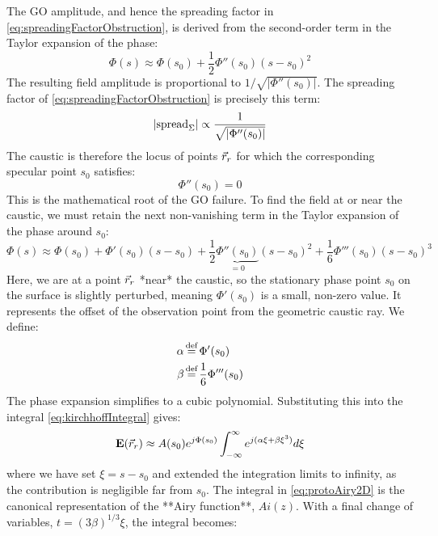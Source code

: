 \documentclass{article}
\begin{document}
The GO amplitude, and hence the spreading factor in \eqref{eq:spreadingFactorObstruction}, is derived from the second-order term in the Taylor expansion of the phase:
\begin{equation}
    \Phi(s) \approx \Phi(s_0) + \frac{1}{2} \Phi''(s_0) (s-s_0)^2
    \label{eq:quadraticPhaseApprox}
\end{equation}
The resulting field amplitude is proportional to $1/\sqrt{|\Phi''(s_0)|}$. The
spreading factor of \eqref{eq:spreadingFactorObstruction} is precisely this term:
\begin{equation}
    |\text{spread}_{\Sigma}| \propto \frac{1}{\sqrt{|\Phi''(s_0)|}}
\end{equation}
The caustic is therefore the locus of points $\vec{r}_r$ for which the corresponding specular point $s_0$ satisfies:
\begin{equation}
    \Phi''(s_0) = 0
    \label{eq:causticCondition}
\end{equation}
This is the mathematical root of the GO failure. To find the field at or near the caustic, we must retain the next non-vanishing term in the Taylor expansion of the phase around $s_0$:
\begin{equation}
    \Phi(s) \approx \Phi(s_0) + \Phi'(s_0) (s-s_0) + \frac{1}{2}\underbrace{\Phi''(s_0)}_{=0} (s-s_0)^2 + \frac{1}{6} \Phi'''(s_0) (s-s_0)^3
\end{equation}
Here, we are at a point $\vec{r}_r$ *near* the caustic, so the stationary phase point $s_0$ on the surface is slightly perturbed, meaning $\Phi'(s_0)$ is a small, non-zero value. It represents the offset of the observation point from the geometric caustic ray. We define:
\begin{align}
    \alpha &\defeq \Phi'(s_0) \\
    \beta &\defeq \frac{1}{6} \Phi'''(s_0)
\end{align}
The phase expansion simplifies to a cubic polynomial. Substituting this into the integral \eqref{eq:kirchhoffIntegral} gives:
\begin{equation}
    \mathbf{E}(\vec{r}_r) \approx A(s_0) e^{j \Phi(s_0)} \int_{-\infty}^{\infty} e^{j (\alpha \xi + \beta \xi^3)} d\xi
    \label{eq:protoAiry2D}
\end{equation}
where we have set $\xi = s-s_0$ and extended the integration limits to infinity, as the contribution is negligible far from $s_0$. The integral in \eqref{eq:protoAiry2D} is the canonical representation of the **Airy function**, $Ai(z)$. With a final change of variables, $t = (3\beta)^{1/3} \xi$, the integral becomes:
\end{document}
